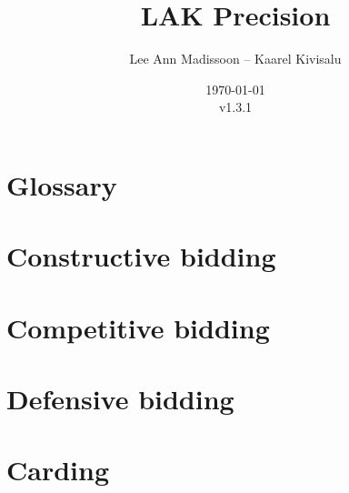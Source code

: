 \documentclass[11pt]{report}
\title{LAK Precision}
\author{Lee Ann Madissoon -- Kaarel Kivisalu}
\date{\today\\v1.3.1}
\begin{document}
\maketitle
\tableofcontents


\chapter*{Glossary}


\chapter{Constructive bidding}



% 
% 












\chapter{Competitive bidding}


\chapter{Defensive bidding}


\chapter{Carding}

\end{document}
